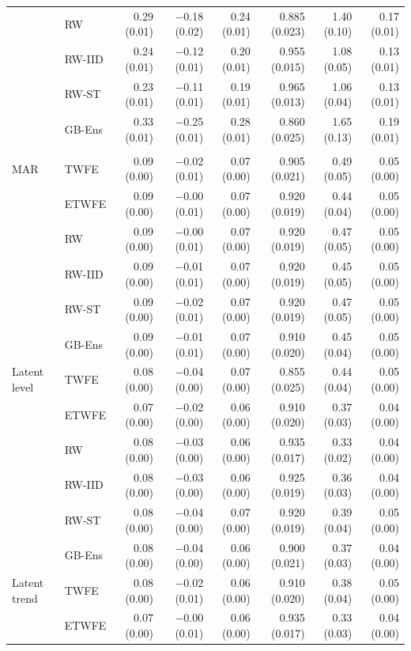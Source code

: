 \begin{table}
\begin{tabular*}{1\linewidth}{@{\extracolsep{\fill}}llrrrrrr}
 & RW & 0.29 (0.01) & −0.18 (0.02) & 0.24 (0.01) & 0.885 (0.023) & 1.40 (0.10) & 0.17 (0.01) \\ 
 & RW-IID & 0.24 (0.01) & −0.12 (0.01) & 0.20 (0.01) & 0.955 (0.015) & 1.08 (0.05) & 0.13 (0.01) \\ 
 & RW-ST & 0.23 (0.01) & −0.11 (0.01) & 0.19 (0.01) & 0.965 (0.013) & 1.06 (0.04) & 0.13 (0.01) \\ 
 & GB-Ens & 0.33 (0.01) & −0.25 (0.01) & 0.28 (0.01) & 0.860 (0.025) & 1.65 (0.13) & 0.19 (0.01) \\ 
\midrule\addlinespace[2.5pt]
\multicolumn{8}{l}{With covariates, event year 0} \\[2.5pt] 
\midrule\addlinespace[2.5pt]
MAR & TWFE & 0.09 (0.00) & −0.02 (0.01) & 0.07 (0.00) & 0.905 (0.021) & 0.49 (0.05) & 0.05 (0.00) \\ 
 & ETWFE & 0.09 (0.00) & −0.00 (0.01) & 0.07 (0.00) & 0.920 (0.019) & 0.44 (0.04) & 0.05 (0.00) \\ 
 & RW & 0.09 (0.00) & −0.00 (0.01) & 0.07 (0.00) & 0.920 (0.019) & 0.47 (0.05) & 0.05 (0.00) \\ 
 & RW-IID & 0.09 (0.00) & −0.01 (0.01) & 0.07 (0.00) & 0.920 (0.019) & 0.45 (0.05) & 0.05 (0.00) \\ 
 & RW-ST & 0.09 (0.00) & −0.02 (0.01) & 0.07 (0.00) & 0.920 (0.019) & 0.47 (0.05) & 0.05 (0.00) \\ 
 & GB-Ens & 0.09 (0.00) & −0.01 (0.01) & 0.07 (0.00) & 0.910 (0.020) & 0.45 (0.04) & 0.05 (0.00) \\ 
Latent level & TWFE & 0.08 (0.00) & −0.04 (0.00) & 0.07 (0.00) & 0.855 (0.025) & 0.44 (0.04) & 0.05 (0.00) \\ 
 & ETWFE & 0.07 (0.00) & −0.02 (0.00) & 0.06 (0.00) & 0.910 (0.020) & 0.37 (0.03) & 0.04 (0.00) \\ 
 & RW & 0.08 (0.00) & −0.03 (0.00) & 0.06 (0.00) & 0.935 (0.017) & 0.33 (0.02) & 0.04 (0.00) \\ 
 & RW-IID & 0.08 (0.00) & −0.03 (0.00) & 0.06 (0.00) & 0.925 (0.019) & 0.36 (0.03) & 0.04 (0.00) \\ 
 & RW-ST & 0.08 (0.00) & −0.04 (0.00) & 0.07 (0.00) & 0.920 (0.019) & 0.39 (0.04) & 0.05 (0.00) \\ 
 & GB-Ens & 0.08 (0.00) & −0.04 (0.00) & 0.06 (0.00) & 0.900 (0.021) & 0.37 (0.03) & 0.04 (0.00) \\ 
Latent trend & TWFE & 0.08 (0.00) & −0.02 (0.01) & 0.06 (0.00) & 0.910 (0.020) & 0.38 (0.04) & 0.05 (0.00) \\ 
 & ETWFE & 0.07 (0.00) & −0.00 (0.01) & 0.06 (0.00) & 0.935 (0.017) & 0.33 (0.03) & 0.04 (0.00) \\ 

\end{tabular*}
\end{table}
